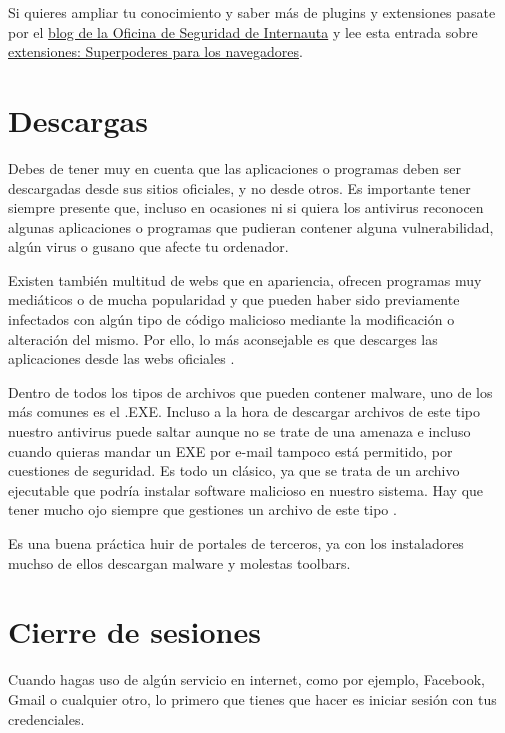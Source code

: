 \documentclass[
  spanish,
  a4paper,
  openany]{book}
\begin{document}
Si quieres ampliar tu conocimiento y saber más de plugins y extensiones pasate por el \href{https://www.osi.es/es/actualidad/blog}{blog de la Oficina de Seguridad de Internauta} y lee esta entrada sobre \href{https://www.osi.es/es/actualidad/blog/2019/11/20/extensiones-superpoderes-para-los-navegadores}{extensiones: Superpoderes para los navegadores}.

\hypertarget{descargas}{%
\section{Descargas}\label{descargas}}

Debes de tener muy en cuenta que las aplicaciones o programas deben ser descargadas desde sus sitios oficiales, y no desde otros. Es importante tener siempre presente que, incluso en ocasiones ni si quiera los antivirus reconocen algunas aplicaciones o programas que pudieran contener alguna vulnerabilidad, algún virus o gusano que afecte tu ordenador.

Existen también multitud de webs que en apariencia, ofrecen programas muy mediáticos o de mucha popularidad y que pueden haber sido previamente infectados con algún tipo de código malicioso mediante la modificación o alteración del mismo. Por ello, lo más aconsejable es que descarges las aplicaciones desde las webs oficiales \citep{software-alterado}.

Dentro de todos los tipos de archivos que pueden contener malware, uno de los más comunes es el .EXE. Incluso a la hora de descargar archivos de este tipo nuestro antivirus puede saltar aunque no se trate de una amenaza e incluso cuando quieras mandar un EXE por e-mail tampoco está permitido, por cuestiones de seguridad. Es todo un clásico, ya que se trata de un archivo ejecutable que podría instalar software malicioso en nuestro sistema. Hay que tener mucho ojo siempre que gestiones un archivo de este tipo \citep{RZ-exe}.

Es una buena práctica huir de portales de terceros, ya con los instaladores muchso de ellos descargan malware y molestas toolbars.

\hypertarget{cierre-de-sesiones}{%
\section{Cierre de sesiones}\label{cierre-de-sesiones}}

Cuando hagas uso de algún servicio en internet, como por ejemplo, Facebook, Gmail o cualquier otro, lo primero que tienes que hacer es iniciar sesión con tus credenciales.
\end{document}
